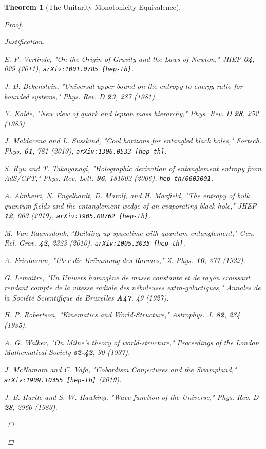 \documentclass[11pt, letterpaper]{report}
\theoremstyle{plain} %
\newtheorem{theorem}{Theorem}[chapter]
\theoremstyle{definition} %
\theoremstyle{remark} %
\begin{document}
\begin{theorem}[The Unitarity-Monotonicity Equivalence]
\begin{proof}
\begin{proof}[Justification]
\begin{thebibliography}{99}
E. P. Verlinde, "On the Origin of Gravity and the Laws of Newton," \textit{JHEP} \textbf{04}, 029 (2011), \texttt{arXiv:1001.0785 [hep-th]}.

J. D. Bekenstein, "Universal upper bound on the entropy-to-energy ratio for bounded systems," \textit{Phys. Rev. D} \textbf{23}, 287 (1981).

Y. Koide, "New view of quark and lepton mass hierarchy," \textit{Phys. Rev. D} \textbf{28}, 252 (1983).

J. Maldacena and L. Susskind, "Cool horizons for entangled black holes," \textit{Fortsch. Phys.} \textbf{61}, 781 (2013), \texttt{arXiv:1306.0533 [hep-th]}.

S. Ryu and T. Takayanagi, "Holographic derivation of entanglement entropy from AdS/CFT," \textit{Phys. Rev. Lett.} \textbf{96}, 181602 (2006), \texttt{hep-th/0603001}.

A. Almheiri, N. Engelhardt, D. Marolf, and H. Maxfield, "The entropy of bulk quantum fields and the entanglement wedge of an evaporating black hole," \textit{JHEP} \textbf{12}, 063 (2019), \texttt{arXiv:1905.08762 [hep-th]}.

M. Van Raamsdonk, "Building up spacetime with quantum entanglement," \textit{Gen. Rel. Grav.} \textbf{42}, 2323 (2010), \texttt{arXiv:1005.3035 [hep-th]}.

A. Friedmann, "Über die Krümmung des Raumes," \textit{Z. Phys.} \textbf{10}, 377 (1922).

G. Lemaître, "Un Univers homogène de masse constante et de rayon croissant rendant compte de la vitesse radiale des nébuleuses extra-galactiques," \textit{Annales de la Société Scientifique de Bruxelles} \textbf{A47}, 49 (1927).

H. P. Robertson, "Kinematics and World-Structure," \textit{Astrophys. J.} \textbf{82}, 284 (1935).

A. G. Walker, "On Milne’s theory of world-structure," \textit{Proceedings of the London Mathematical Society} \textbf{s2-42}, 90 (1937).

J. McNamara and C. Vafa, "Cobordism Conjectures and the Swampland," \texttt{arXiv:1909.10355 [hep-th]} (2019).

J. B. Hartle and S. W. Hawking, "Wave function of the Universe," \textit{Phys. Rev. D} \textbf{28}, 2960 (1983).


\end{thebibliography}
\end{proof}
\end{proof}
\end{theorem}
\end{document}
